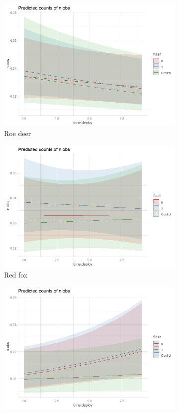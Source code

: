 \begin{figure}
		\begin{subfigure}{.5\textwidth}
		  \centering
		  	\includegraphics[width=.8\linewidth]{../R/glmm_sp_files/figure-gfm/raadyr-C-report-1.png}
		  \caption{Roe deer}
		  	\label{fig:glmm_raa}
	\end{subfigure}
		\begin{subfigure}{.5\textwidth}
		  \centering
		  	\includegraphics[width=.8\linewidth]{../R/glmm_sp_files/figure-gfm/rev-report-1.png}
		  \caption{Red fox}
		  	\label{fig:glmm_rev}
	\end{subfigure}
		\begin{subfigure}{.5\textwidth}
		  \centering
		  	\includegraphics[width=.8\linewidth]{../R/glmm_sp_files/figure-gfm/grevling-report-1.png}

\end{subfigure}
\end{figure}
